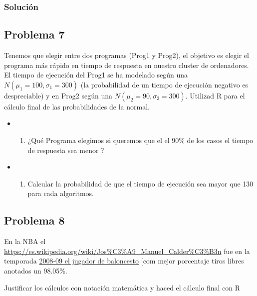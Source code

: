 \documentclass[
]{article}
\providecommand{\tightlist}{%
  \setlength{\itemsep}{0pt}\setlength{\parskip}{0pt}}
\begin{document}
\hypertarget{soluciuxf3n-5}{%
\subsubsection{Solución}\label{soluciuxf3n-5}}

\hypertarget{problema-7}{%
\subsection{Problema 7}\label{problema-7}}

Tenemos que elegir entre dos programas (Prog1 y Prog2), el objetivo es
elegir el programa más rápido en tiempo de respuesta en nuestro cluster
de ordenadores. El tiempo de ejecución del Prog1 se ha modelado según
una \(N(\mu_1=100, \sigma_1=300)\) (la probabilidad de un tiempo de
ejecución negativo es despreciable) y en Prog2 según una
\(N(\mu_2=90, \sigma_2=300)\). Utilizad R para el cálculo final de las
probabilidades de la normal.

\begin{itemize}
\item
  \begin{enumerate}
  \def\labelenumi{\alph{enumi})}
  \tightlist
  \item
    ¿Qué Programa elegimos si queremos que el el 90\% de los casos el
    tiempo de respuesta sea menor ?
  \end{enumerate}
\item
  \begin{enumerate}
  \def\labelenumi{\alph{enumi})}
  \setcounter{enumi}{1}
  \tightlist
  \item
    Calcular la probabilidad de que el tiempo de ejecución sea mayor que
    130 para cada algoritmos.
  \end{enumerate}
\end{itemize}

\hypertarget{problema-8}{%
\subsection{Problema 8}\label{problema-8}}

En la NBA el
\href{José\%20Calderón}{https://es.wikipedia.org/wiki/Jos\%C3\%A9\_Manuel\_Calder\%C3\%B3n}
fue en la temporada
\href{https://es.wikipedia.org/wiki/L\%C3\%ADderes_en_porcentaje_de_tiros_libres_de_la_NBA}{2008-09
el jugador de baloncesto} {[}com mejor porcentaje tiros libres anotados
un 98.05\%.

Justificar los cálculos con notación matemática y haced el cálculo final
con R
\end{document}
